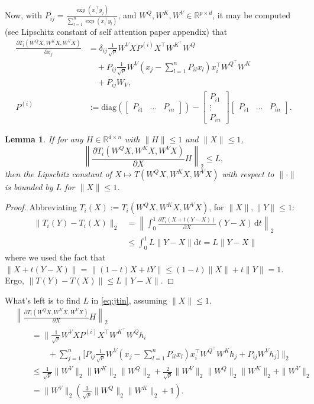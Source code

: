 \documentclass{article}
\newtheorem{lemma}{Lemma}
\begin{document}
Now, with $P_{ij} = \frac{\exp(x_i^\top y_j)}{\sum_{l=1}^n \exp(x_i^\top y_l)}$,
and $W^Q, W^K, W^V \in \mathbb R^{p\times d}$,
it may be computed (see Lipschitz constant of self attention paper appendix) that 
\begin{align*}
  \frac{\partial T_i(W^QX, W^KX, W^VX)}{\partial x_j}
  &= \delta_{ij}\frac1{\sqrt p} W^V X P^{(i)} X^\top W^{K^\top} W^Q\\
  &\quad + P_{ij}\frac1{\sqrt p}W^V (x_j - 
  \sum_{l=1}^n P_{il} x_l) x_i^\top W^{Q^\top} W^K\\
  &\quad + P_{ij}W_V, \\
  P^{(i)} &:= \mathrm{diag}\left(\begin{bmatrix} P_{i1} & \ldots & P_{in}
  \end{bmatrix}\right) - \begin{bmatrix} P_{i1} \\ \vdots \\ P_{in}\end{bmatrix}
    \begin{bmatrix}  P_{i1} & \ldots & P_{in}\end{bmatrix}.
\end{align*}
\begin{lemma}
  \label{lem:jaclip}
If for any $H\in\mathbb R^{d\times n}$ with $\|H\|\leq 1$ and
$\|X\|\leq 1$,
\begin{equation}
  \label{eq:jtin}
  \left\|\frac{\partial T_i(W^QX, W^KX, W^VX)}{\partial X} H\right\|_2 
  \leq L,
\end{equation}
then the Lipschitz constant of $X\mapsto T(W^QX, W^KX, W^VX)$ with respect to 
$\|\cdot\|$ is bounded by $L$ for $\|X\|\leq 1$.
\end{lemma}
\begin{proof}
Abbreviating $T_i(X) := T_i(W^QX, W^KX, W^VX)$, for $\|X\|, \|Y\|\leq 1$:
\begin{align*}
  \|T_i(Y) - T_i(X)\|_2 &= \left\|\int_{0}^1 \frac{\partial T_i(X + t(Y-X))}{
  \partial X}(Y-X)\,\mathrm dt\right\|_2 \\
  &\leq \int_0^1 L \|Y-X\| \mathrm dt = L \|Y-X\|
\end{align*}
where we used the fact that $\|X + t(Y-X)\| = \|(1-t)X + tY\| \leq (1-t)\|X\|
+t\|Y\| = 1$. Ergo, $\|T(Y) - T(X)\| \leq L\|Y-X\|$.
\end{proof}
What's left is to find $L$ in \eqref{eq:jtin}, assuming $\|X\|\leq 1$.
\begin{align*}
  &\left\|\frac{\partial T_i(W^Q X, W^KX, W^VX)}{\partial X}H\right\|_2 \\
  &\qquad=
  \bigg\|\frac1{\sqrt p}W^V XP^{(i)}X^\top
  W^{K^\top}W^Q h_i \\
  &\qquad\qquad+\sum_{j=1}^n\big[P_{ij} \frac1{\sqrt p}
  W^V(x_j - \sum_{l=1}^n P_{il}x_l)x_i^\top
  W^{Q^\top} W^Kh_j 
  + P_{ij}W^Vh_j\big]\bigg\|_2 \\
  &\qquad\leq\frac1{\sqrt p}\|W^V\|_2 \|W^K\|_2\|W^Q\|_2 + \frac 2{\sqrt p}
  \|W^V\|_2 \|W^Q\|_2 \|W^K\|_2 + \|W^V\|_2 \\
  &\qquad= \|W^V\|_2\left(\frac3{\sqrt p}\|W^Q\|_2\|W^K\|_2 + 1\right).
\end{align*}
\end{document}
